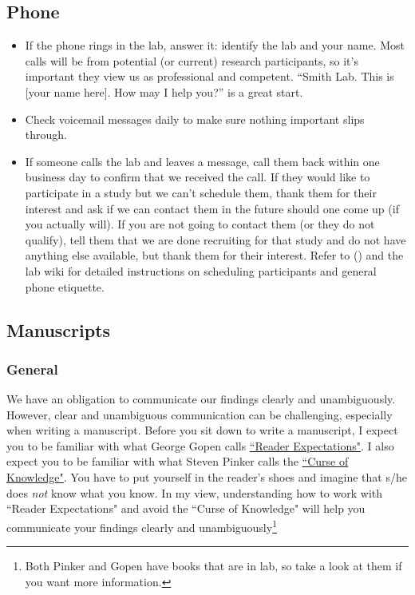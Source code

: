 \documentclass[letterpaper,12pt,oneside]{memoir}
\begin{document}
\subsection{Phone}

\begin{itemize}
\item If the phone rings in the lab, answer it: identify the lab and your name. Most calls will be from potential (or current) research participants, so it's important they view us as professional and competent. ``Smith Lab. This is [your name here]. How may I help you?'' is a great start. 

\item Check voicemail messages daily to make sure nothing important slips through.

\item If someone calls the lab and leaves a message, call them back within one business day to confirm that we received the call. If they would like to participate in a study but we can't schedule them, thank them for their interest and ask if we can contact them in the future should one come up (if you actually will). If you are not going to contact them (or they do not qualify), tell them that we are done recruiting for that study and do not have anything else available, but thank them for their interest. Refer to  () and the lab wiki for detailed instructions on scheduling participants and general phone etiquette.

\end{itemize}



\subsection{Manuscripts}

\subsubsection{General}

We have an obligation to communicate our findings clearly and unambiguously. However, clear and unambiguous communication can be challenging, especially when writing a manuscript. Before you sit down to write a manuscript, I expect you to be familiar with what George Gopen calls \href{https://cseweb.ucsd.edu/~swanson/papers/science-of-writing.pdf}{``Reader Expectations"}. I also expect you to be familiar with what Steven Pinker calls the \href{https://stevenpinker.com/files/pinker/files/why_academics_stink_at_writing.pdf}{``Curse of Knowledge"}. You have to put yourself in the reader's shoes and imagine that s/he does \textit{not} know what you know. In my view, understanding how to work with ``Reader Expectations" and avoid the ``Curse of Knowledge" will help you communicate your findings clearly and unambiguously\footnote{Both Pinker and Gopen have books that are in lab, so take a look at them if you want more information.}
\end{document}
